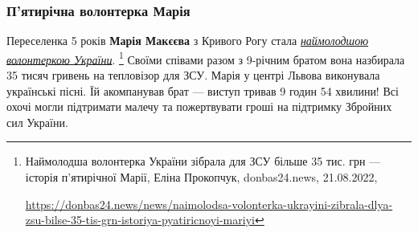  
 
 
 
 

\subsubsection{П'ятирічна волонтерка Марія}


Переселенка 5 років \textbf{Марія Макєєва} з Кривого Рогу стала \href{https://donbas24.news/news/naimolodsa-volonterka-ukrayini-zibrala-dlya-zsu-bilse-35-tis-grn-istoriya-pyatiricnoyi-mariyi}{\emph{наймолодшою волонтеркою України}}.%
\footnote{Наймолодша волонтерка України зібрала для ЗСУ більше 35 тис. грн — історія п'ятирічної Марії, Еліна Прокопчук, donbas24.news, 21.08.2022, \par\url{https://donbas24.news/news/naimolodsa-volonterka-ukrayini-zibrala-dlya-zsu-bilse-35-tis-grn-istoriya-pyatiricnoyi-mariyi}}
Своїми співами разом з 9-річним братом вона назбирала 35 тисяч гривень
на тепловізор для ЗСУ. Марія у центрі Львова виконувала українські пісні. Їй
акомпанував брат — виступ тривав 9 годин 54 хвилини! Всі охочі могли підтримати
малечу та пожертвувати гроші на підтримку Збройних сил України.
